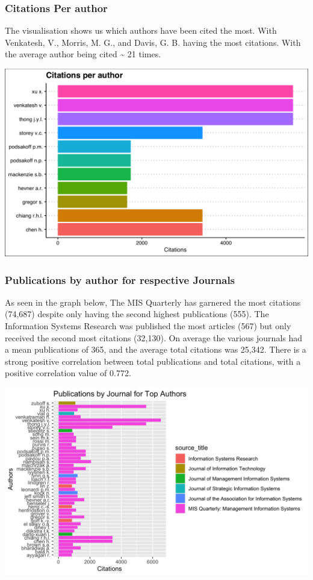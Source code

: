 \documentclass[
  letterpaper,
  DIV=11,
  numbers=noendperiod]{scrartcl}
\begin{document}
\hypertarget{citations-per-author}{%
\subsubsection{Citations Per author}\label{citations-per-author}}

The visualisation shows us which authors have been cited the most. With
Venkatesh, V., Morris, M. G., and Davis, G. B. having the most
citations. With the average author being cited \textasciitilde{} 21
times.

\includegraphics{images/cite_per_auth-01.png}

\hypertarget{publications-by-author-for-respective-journals}{%
\subsubsection{Publications by author for respective
Journals}\label{publications-by-author-for-respective-journals}}

As seen in the graph below, The MIS Quarterly has garnered the most
citations (74,687) despite only having the second highest publications
(555). The Information Systems Research was published the most articles
(567) but only received the second most citations (32,130). On average
the various journals had a mean publications of 365, and the average
total citations was 25,342. There is a strong positive correlation
between total publications and total citations, with a positive
correlation value of 0.772.

\includegraphics{images/pub_journ_auth.png}
\end{document}
